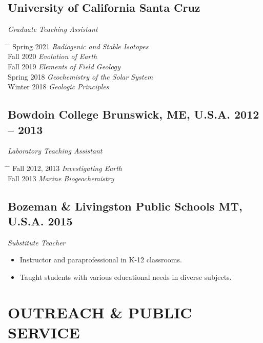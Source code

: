 \documentclass[10pt]{article}
\begin{document}
\subsection*{\textbf{University of California Santa Cruz}}
\textit{Graduate Teaching Assistant}
\begin{tabbing} \hspace{10pt} \= \hspace{2.5cm} \=  \kill
\> Spring 2021 \> \textit{Radiogenic and Stable Isotopes}\\
\> Fall 2020 \> \textit{Evolution of Earth}\\
\> Fall 2019 \> \textit{Elements of Field Geology}\\
\> Spring 2018 \>  \textit{Geochemistry of the Solar System}\\
\> Winter 2018 \> \textit{Geologic Principles}
\end{tabbing}

\subsection*{\textbf{Bowdoin College} \hspace{15pt} Brunswick, ME, U.S.A. \hfill 2012 – 2013}
\textit{Laboratory Teaching Assistant}
\begin{tabbing} \hspace{10pt} \= \hspace{2.5cm} \=  \kill
\> Fall 2012, 2013 \> \textit{Investigating Earth}\\
\> Fall 2013 \> \textit{Marine Biogeochemistry}
\end{tabbing}

\subsection*{\textbf{Bozeman \& Livingston Public Schools} \hspace{15pt} MT, U.S.A. \hfill 2015}
\textit{Substitute Teacher}
\begin{itemize}
	\item Instructor and paraprofessional in K-12 classrooms.
	\item Taught students with various educational needs in diverse subjects.
\end{itemize}


\section*{OUTREACH \& PUBLIC SERVICE}
\end{document}
